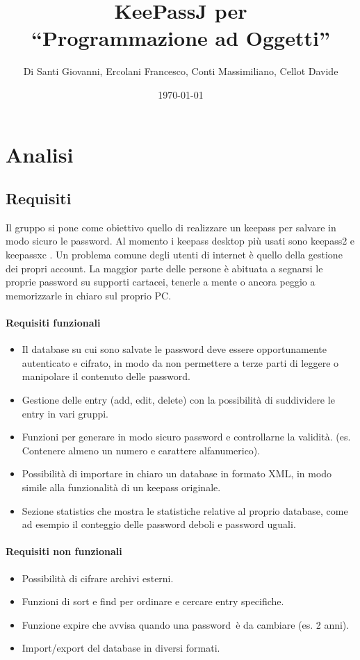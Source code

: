 \documentclass[a4paper,12pt]{report}
\title{KeePassJ per\\``Programmazione ad Oggetti''}
\author{Di Santi Giovanni, Ercolani Francesco, Conti Massimiliano, Cellot Davide}
\date{\today}
\begin{document}
 
\maketitle

\tableofcontents

\chapter{Analisi}

\section{Requisiti}

Il gruppo si pone come obiettivo quello di realizzare un keepass per salvare
in modo sicuro le password. Al momento i keepass desktop più usati sono keepass2
\cite{keepass2} e keepassxc \cite{keepassxc}.
Un problema comune degli utenti di internet è quello della gestione dei propri account.
La maggior parte delle persone è abituata a segnarsi le proprie password su 
supporti cartacei, tenerle a mente o ancora peggio a memorizzarle in chiaro sul 
proprio PC.

\subsubsection{Requisiti funzionali}
\begin{itemize}
  \item Il database su cui sono salvate le password deve essere opportunamente
    autenticato e cifrato, in modo da non permettere a terze parti di leggere
    o manipolare il contenuto delle password.
  \item Gestione delle entry (add, edit, delete) con la possibilità di suddividere
    le entry in vari gruppi.
  \item Funzioni per generare in modo sicuro password e controllarne la validità.
    (es. Contenere almeno un numero e carattere alfanumerico).
  \item Possibilità di importare in chiaro un database in formato XML, in modo simile
    alla funzionalità di un keepass originale.
  \item Sezione statistics che mostra le statistiche relative al proprio database,
    come ad esempio il conteggio delle password deboli e password uguali.
  
\end{itemize}

\subsubsection{Requisiti non funzionali}
\begin{itemize}
  \item Possibilità di cifrare archivi esterni.
  \item Funzioni di sort e find per ordinare e cercare entry specifiche.
  \item Funzione expire che avvisa quando una password è da cambiare (es. 2 anni).
  \item Import/export del database in diversi formati.
\end{itemize}
\end{document}
